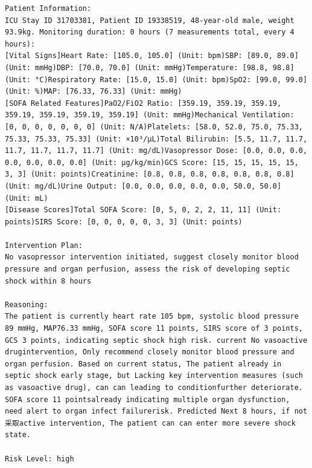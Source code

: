 \documentclass{article}
\begin{document}
\begin{lstlisting}[caption={Result for Patient 31703381}, label={lst:31703381}]
Patient Information:
ICU Stay ID 31703381, Patient ID 19338519, 48-year-old male, weight 93.9kg. Monitoring duration: 0 hours (7 measurements total, every 4 hours):
[Vital Signs]Heart Rate: [105.0, 105.0] (Unit: bpm)SBP: [89.0, 89.0] (Unit: mmHg)DBP: [70.0, 70.0] (Unit: mmHg)Temperature: [98.8, 98.8] (Unit: °C)Respiratory Rate: [15.0, 15.0] (Unit: bpm)SpO2: [99.0, 99.0] (Unit: %)MAP: [76.33, 76.33] (Unit: mmHg)
[SOFA Related Features]PaO2/FiO2 Ratio: [359.19, 359.19, 359.19, 359.19, 359.19, 359.19, 359.19] (Unit: mmHg)Mechanical Ventilation: [0, 0, 0, 0, 0, 0, 0] (Unit: N/A)Platelets: [58.0, 52.0, 75.0, 75.33, 75.33, 75.33, 75.33] (Unit: ×10³/μL)Total Bilirubin: [5.5, 11.7, 11.7, 11.7, 11.7, 11.7, 11.7] (Unit: mg/dL)Vasopressor Dose: [0.0, 0.0, 0.0, 0.0, 0.0, 0.0, 0.0] (Unit: μg/kg/min)GCS Score: [15, 15, 15, 15, 15, 3, 3] (Unit: points)Creatinine: [0.8, 0.8, 0.8, 0.8, 0.8, 0.8, 0.8] (Unit: mg/dL)Urine Output: [0.0, 0.0, 0.0, 0.0, 0.0, 50.0, 50.0] (Unit: mL)
[Disease Scores]Total SOFA Score: [0, 5, 0, 2, 2, 11, 11] (Unit: points)SIRS Score: [0, 0, 0, 0, 0, 3, 3] (Unit: points)

Intervention Plan:
No vasopressor intervention initiated, suggest closely monitor blood pressure and organ perfusion, assess the risk of developing septic shock within 8 hours

Reasoning:
The patient is currently heart rate 105 bpm, systolic blood pressure 89 mmHg, MAP76.33 mmHg, SOFA score 11 points, SIRS score of 3 points, GCS 3 points, indicating septic shock high risk. current No vasoactive drugintervention, Only recommend closely monitor blood pressure and organ perfusion. Based on current status, The patient already in septic shock early stage, but Lacking key intervention measures (such as vasoactive drug), can can leading to conditionfurther deteriorate. SOFA score 11 pointsalready indicating multiple organ dysfunction, need alert to organ infect failurerisk. Predicted Next 8 hours, if not 采取active intervention, The patient can can enter more severe shock state.

Risk Level: high
\end{lstlisting}
\end{document}
